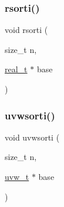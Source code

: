 \subsubsection{\texorpdfstring{rsorti()}{rsorti()}}
{\footnotesize\ttfamily void rsorti (\begin{DoxyParamCaption}\item[{size\+\_\+t}]{n,  }\item[{\hyperlink{a00876_a1924a4f6907cc3833213aba1f07fcbe9}{real\+\_\+t} $\ast$}]{base }\end{DoxyParamCaption})}

\mbox{\label{a00209_a26aa6506404f80ed9e0b48249f4d4748}} 
\subsubsection{\texorpdfstring{uvwsorti()}{uvwsorti()}}
{\footnotesize\ttfamily void uvwsorti (\begin{DoxyParamCaption}\item[{size\+\_\+t}]{n,  }\item[{\hyperlink{a00710}{uvw\+\_\+t} $\ast$}]{base }\end{DoxyParamCaption})}

